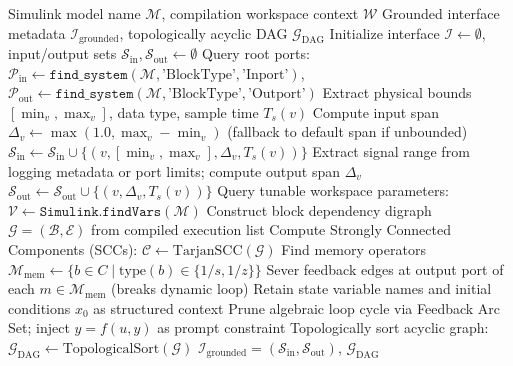 \documentclass[journal]{IEEEtran}
\begin{document}
\begin{algorithm}[!t]
\footnotesize
\caption{Automated Simulink Interface Grounding and Loop-Cut DAG Extraction (ASIE)}
\label{alg:asie_extraction}
\begin{algorithmic}[1]
\REQUIRE Simulink model name $\mathcal{M}$, compilation workspace context $\mathcal{W}$
\ENSURE Grounded interface metadata $\mathcal{I}_{\text{grounded}}$, topologically acyclic DAG $\mathcal{G}_{\text{DAG}}$
\STATE Initialize interface $\mathcal{I} \leftarrow \emptyset$, input/output sets $\mathcal{S}_{\text{in}}, \mathcal{S}_{\text{out}} \leftarrow \emptyset$
\STATE Query root ports: $\mathcal{P}_{\text{in}} \leftarrow \texttt{find\_system}(\mathcal{M}, \text{'BlockType'}, \text{'Inport'})$, $\mathcal{P}_{\text{out}} \leftarrow \texttt{find\_system}(\mathcal{M}, \text{'BlockType'}, \text{'Outport'})$
    \STATE Extract physical bounds $[\min_v, \max_v]$, data type, sample time $T_s(v)$
    \STATE Compute input span $\Delta_v \leftarrow \max(1.0, \max_v - \min_v)$ (fallback to default span if unbounded)
    \STATE $\mathcal{S}_{\text{in}} \leftarrow \mathcal{S}_{\text{in}} \cup \{(v, [\min_v, \max_v], \Delta_v, T_s(v))\}$
\ENDFOR
{}
    \STATE Extract signal range from logging metadata or port limits; compute output span $\Delta_v$
    \STATE $\mathcal{S}_{\text{out}} \leftarrow \mathcal{S}_{\text{out}} \cup \{(v, \Delta_v, T_s(v))\}$
\ENDFOR
\STATE Query tunable workspace parameters: $\mathcal{V} \leftarrow \texttt{Simulink.findVars}(\mathcal{M})$
\STATE Construct block dependency digraph $\mathcal{G} = (\mathcal{B}, \mathcal{E})$ from compiled execution list
\STATE Compute Strongly Connected Components (SCCs): $\mathcal{C} \leftarrow \text{TarjanSCC}(\mathcal{G})$
    \STATE Find memory operators $\mathcal{M}_{\text{mem}} \leftarrow \{b \in C \mid \text{type}(b) \in \{1/s, 1/z\}\}$
        \STATE Sever feedback edges at output port of each $m \in \mathcal{M}_{\text{mem}}$ (breaks dynamic loop)
        \STATE Retain state variable names and initial conditions $x_0$ as structured context
    \ELSE
        \STATE Prune algebraic loop cycle via Feedback Arc Set; inject $y = f(u, y)$ as prompt constraint
    \ENDIF
\ENDFOR
\STATE Topologically sort acyclic graph: $\mathcal{G}_{\text{DAG}} \leftarrow \text{TopologicalSort}(\mathcal{G})$
\RETURN $\mathcal{I}_{\text{grounded}} = (\mathcal{S}_{\text{in}}, \mathcal{S}_{\text{out}})$, $\mathcal{G}_{\text{DAG}}$
\end{algorithmic}
\end{algorithm}
\end{document}
